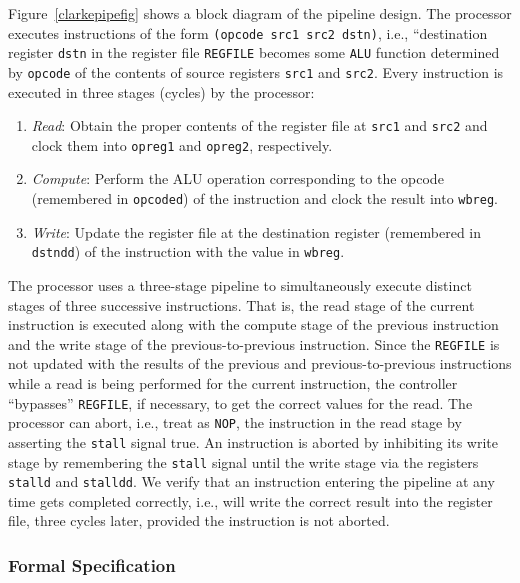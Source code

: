 Figure~\ref{clarkepipefig} shows a block diagram of the pipeline
design.  The processor executes instructions of
the form {\tt (opcode src1 src2 dstn)}, i.e., ``destination register
{\tt dstn} in the register file {\tt REGFILE} becomes some {\tt ALU}
function determined by {\tt opcode} of the contents of source registers
{\tt src1} and {\tt src2}.
Every instruction is executed in three stages (cycles) by the processor:
\begin{enumerate}
\item {\em Read}: Obtain the proper contents of the register file at {\tt src1}
and {\tt src2} and clock them into {\tt opreg1} and {\tt opreg2},
respectively.

\item {\em Compute}: Perform the ALU operation corresponding to the
opcode (remembered in {\tt opcoded}) of the instruction and clock the
result into {\tt wbreg}.

\item {\em Write}: Update the register file at the destination register
(remembered in {\tt dstndd}) of the instruction with the value in
{\tt wbreg}.
\end{enumerate}
The processor uses a three-stage pipeline to simultaneously execute
distinct stages of three successive instructions.  That is, 
the read stage of the current instruction is executed along with the
compute stage of the previous instruction and the write stage
of the previous-to-previous instruction.
Since the {\tt REGFILE} is not updated with the results of the previous and
previous-to-previous instructions while a read is being
performed for the current instruction, the controller
``bypasses'' {\tt REGFILE}, if necessary, to get the correct values for
the read.  The processor can abort, i.e., treat as {\tt NOP},
the instruction in the read stage by asserting the {\tt stall} signal true.
An instruction is aborted by inhibiting its write stage
by remembering the {\tt stall} signal until the write stage via
the registers {\tt stalld} and {\tt stalldd}.
We verify that an instruction entering the pipeline
at any time gets completed correctly, i.e., will write the correct result
into the register file, three cycles later, provided the instruction
is not aborted.

\subsubsection{Formal Specification}

